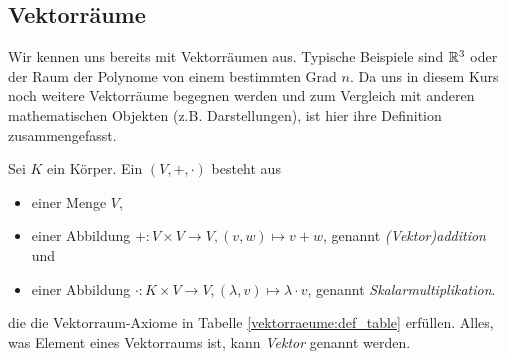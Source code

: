 \subsection{Vektorräume}
Wir kennen uns bereits mit Vektorräumen aus. Typische Beispiele sind $\mathbb{R}^3$ oder der Raum der Polynome von einem bestimmten Grad $n$. Da uns in diesem Kurs noch weitere Vektorräume begegnen werden und zum Vergleich mit anderen mathematischen Objekten (z.B. Darstellungen), ist hier ihre Definition zusammengefasst.

\begin{definition}\label{vektorraeume:def}
Sei $K$ ein Körper. Ein  $(V,+,\cdot)$ besteht aus
\begin{itemize}
	\item einer Menge $V$,
	\item einer Abbildung $+: V \times V \to V, (v,w) \mapsto v+w$, genannt \emph{(Vektor)addition} und
	\item einer Abbildung $\cdot: K \times V \to V, (\lambda,v) \mapsto \lambda\cdot v$, genannt \emph{Skalarmultiplikation}.
\end{itemize}
die die Vektorraum-Axiome in Tabelle \ref{vektorraeume:def_table} erfüllen. Alles, was Element eines Vektorraums ist, kann \emph{Vektor} genannt werden.

\begin{table}[!ht]
	\setlength\extrarowheight{10pt} %
	\begin{tabularx}{\textwidth}{p{7cm} X}
		

\end{tabularx}
\end{table}
\end{definition}
